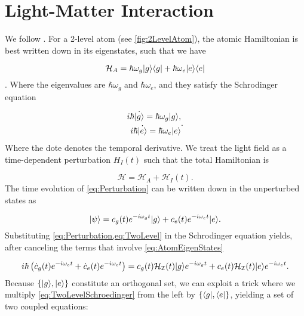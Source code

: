 \chapter{Light-Matter Interaction}\label{ch:LightMatter}

We follow \cite{Leeuwen2017}. For a 2-level atom (see \cref{fig:2LevelAtom}), the atomic Hamiltonian is best written down in its eigenstates, such that we have 

\begin{equation}\label{eq:AtomHamiltonian}
	\mathcal{H}_A = \hbar \omega_g \lvert g\rangle\langle g\rvert + \hbar \omega_e \lvert e\rangle\langle e\rvert
\end{equation}.
Where the eigenvalues are $\hbar \omega_g$ and $\hbar \omega_e$, and they satisfy the Schrodinger equation

\begin{subequations}\label{eq:AtomEigenStates}
	\begin{align}
		i \hbar \dot{\ket{g}}= \hbar \omega_g \ket{g}, \\
		i \hbar \dot{\ket{e}}= \hbar \omega_e \ket{e}
	\end{align}.
\end{subequations}
Where the dote denotes the temporal derivative. We treat the light field as a time-dependent perturbation $H_{I}(t)$ such that the total Hamiltonian is

\begin{equation}\label{eq:Perturbation}
	\mathcal{H} = \mathcal{H}_A + \mathcal{H}_{I}(t).
\end{equation}
The time evolution of \cref{eq:Perturbation} can be written down in the unperturbed states as

\begin{equation}\label{eq:TwoLevel}
	\lvert\psi\rangle = c_g(t) e^{-i \omega_g t} \lvert g\rangle + c_e(t) e^{-i \omega_e t} \lvert e\rangle.
\end{equation}
Substituting \cref{eq:Perturbation,eq:TwoLevel} in the Schrodinger equation yields, after canceling the terms that involve \cref{eq:AtomEigenStates} 

\begin{equation}\label{eq:TwoLevelSchroedinger}
	i \hbar \left(\dot{c}_g(t) e^{-i \omega_e t}+\dot{c}_e(t) e^{-i \omega_e t} \right) = c_g(t) \mathcal{H_I}(t)\lvert g\rangle e^{-i \omega_g t} + c_e(t) \mathcal{H_I}(t) \lvert e\rangle e^{-i \omega_e t}.
\end{equation}
Because $\{\lvert g\rangle,\lvert e\rangle\}$ constitute an orthogonal set, we can exploit a trick where we multiply \cref{eq:TwoLevelSchroedinger} from the left by $\{\langle g\rvert,\langle e\rvert\}$, yielding a set of two coupled equations:

